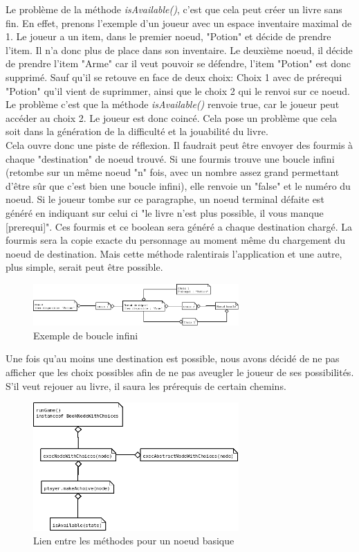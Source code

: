 			Le problème de la méthode \textit{isAvailable()}, c'est que cela peut créer un livre sans fin. En effet, prenons l'exemple d'un joueur avec un espace inventaire maximal de 1. Le joueur a un item, dans le premier noeud, "Potion" et décide de prendre l'item. Il n'a donc plus de place dans son inventaire. Le deuxième noeud, il décide de prendre l'item "Arme" car il veut pouvoir se défendre, l'item "Potion" est donc supprimé. Sauf qu'il se retouve en face de deux choix: Choix 1 avec de prérequi "Potion" qu'il vient de suprimmer, ainsi que le choix 2 qui le renvoi sur ce noeud. Le problème c'est que la méthode \textit{isAvailable()} renvoie true, car le joueur peut accéder au choix 2. Le joueur est donc coincé. Cela pose un problème que cela soit dans la génération de la difficulté et la jouabilité du livre.\\
			Cela ouvre donc une piste de réflexion. Il faudrait peut être envoyer des fourmis à chaque "destination" de noeud trouvé. Si une fourmis trouve une boucle infini (retombe sur un même noeud "n" fois, avec un nombre assez grand permettant d'être sûr que c'est bien une boucle infini), elle renvoie un "false" et le numéro du noeud. Si le joueur tombe sur ce paragraphe, un noeud terminal défaite est généré en indiquant sur celui ci "le livre n'est plus possible, il vous manque [prerequi]". Ces fourmis et ce boolean sera généré a chaque destination chargé. La fourmis sera la copie exacte du personnage au moment même du chargement du noeud de destination. Mais cette méthode ralentirais l'application et une autre, plus simple, serait peut être possible.

			\begin{figure}[H]
				\centering\includegraphics[width=0.70\textwidth]{img/JeuBoucleInfiniExemple.png}
				\caption{Exemple de boucle infini}
			\end{figure}


			Une fois qu'au moins une destination est possible, nous avons décidé de ne pas afficher que les choix possibles afin de ne pas aveugler le joueur de ses possibilités. S'il veut rejouer au livre, il saura les prérequis de certain chemins.

			\begin{figure}[H]
				\centering\includegraphics[width=0.70\textwidth]{img/JeuBookNodeWithChoices.png}
				\caption{Lien entre les méthodes pour un noeud basique}
				\label{fig:JeuBookNodeWithChoices}
			\end{figure}


